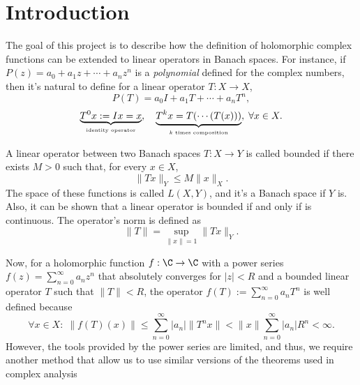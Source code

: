 
\section{Introduction}

The goal of this project is to describe how the definition of holomorphic complex functions can be extended to linear operators in Banach spaces. For instance, if $P(z) = a_0 + a_1 z +\cdots + a_n z^n$ is a \textit{polynomial} defined for the complex numbers, then it's natural to define for a linear operator $T : X \to X$,
\[ P(T) = a_0 I + a_1 T + \cdots + a_n T^n, \]
\[ \underbrace{T^0 x := I x = x}_{\mbox{\tiny identity operator}},\quad \underbrace{T^k x = T(\cdots(T(x)))}_{\mbox{\tiny $k$ times composition}},\; \forall x \in X. \]

\begin{definition}\label{def:bounded_linear_operator}\label{def:operator_norm}
    A linear operator between two Banach spaces $T: X \to Y$ is called bounded if there exists $M > 0$ such that, for every $x \in X$,
    \[ \|Tx\|_Y \leq M \|x\|_X. \]
    The space of these functions is called $L(X,Y)$, and it's a Banach space if $Y$ is. Also, it can be shown that a linear operator is bounded if and only if is continuous. The operator's norm is defined as
    \[ \|T\| = \sup_{\|x\| = 1} \|Tx\|_Y. \]
\end{definition}

Now, for a holomorphic function $f: \C \to \C$ with a power series $f(z) = \sum_{n = 0}^{\infty} a_n z^n$ that absolutely converges for $|z| < R$ and a bounded linear operator $T$ such that $\|T\| < R$, the operator $f(T) := \sum_{n = 0}^{\infty} a_n T^n$ is well defined because
\[ \forall x \in X:\; \|f(T)(x)\| \leq \sum_{n = 0}^{\infty} |a_n| \|T^n x\| < \|x\| \sum_{n = 0}^{\infty} |a_n| R^n < \infty. \]
However, the tools provided by the power series are limited, and thus, we require another method that allow us to use similar versions of the theorems used in complex analysis

